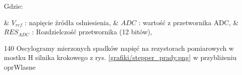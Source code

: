 Gdzie:
\begin{easylist}
	& $ V_{ref} $ : napięcie źródła odniesienia,
	& $ ADC $ : wartość z przetwornika ADC,
	& $ RES_{ADC} $ : Rozdzielczość przetwornika (12 bitów),
\end{easylist} 

	{140}
	{Oscylogramy mierzonych spadków napięć na rezystorach pomiarowych w mostku H silnika krokowego z rys. \ref{grafiki/stepper_prady.png} w przybliżeniu}
	{oprWlasne}












\clearpage